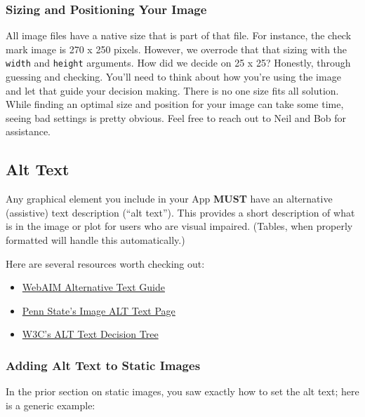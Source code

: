 \documentclass[
]{book}
\providecommand{\tightlist}{%
  \setlength{\itemsep}{0pt}\setlength{\parskip}{0pt}}
\begin{document}
\hypertarget{sizing-and-positioning-your-image}{%
\subsubsection{Sizing and Positioning Your Image}\label{sizing-and-positioning-your-image}}

All image files have a native size that is part of that file. For instance, the check mark image is 270 x 250 pixels. However, we overrode that that sizing with the \texttt{width} and \texttt{height} arguments. How did we decide on 25 x 25? Honestly, through guessing and checking. You'll need to think about how you're using the image and let that guide your decision making. There is no one size fits all solution. While finding an optimal size and position for your image can take some time, seeing bad settings is pretty obvious. Feel free to reach out to Neil and Bob for assistance.

\hypertarget{altText}{%
\subsection{Alt Text}\label{altText}}

Any graphical element you include in your App \textbf{MUST} have an alternative (assistive) text description (``alt text''). This provides a short description of what is in the image or plot for users who are visual impaired. (Tables, when properly formatted will handle this automatically.)

Here are several resources worth checking out:

\begin{itemize}
\tightlist
\item
  \href{https://webaim.org/techniques/alttext/\#basics}{WebAIM Alternative Text Guide}
\item
  \href{https://accessibility.psu.edu/images/alttext/}{Penn State's Image ALT Text Page}
\item
  \href{https://www.w3.org/WAI/tutorials/images/decision-tree/}{W3C's ALT Text Decision Tree}
\end{itemize}

\hypertarget{altStatic}{%
\subsubsection{Adding Alt Text to Static Images}\label{altStatic}}

In the prior section on static images, you saw exactly how to set the alt text; here is a generic example:
\end{document}
